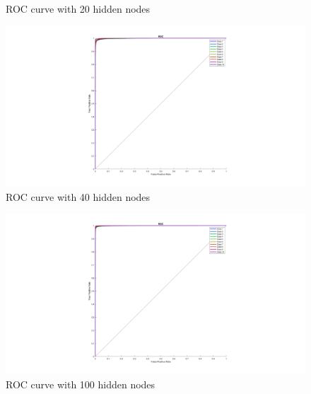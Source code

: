 \documentclass{article}
\begin{document}
{{\begin{figure}[H]
            \caption{ROC curve with 20 hidden nodes}
        \end{figure}
        \begin{figure}[H]
            \centering
            \includegraphics[width = 1.0\linewidth]{src1/ROC_40.png}
            \caption{ROC curve with 40 hidden nodes}
        \end{figure}
        \begin{figure}[H]
            \centering
            \includegraphics[width = 1.0\linewidth]{src1/ROC_100.png}
            \caption{ROC curve with 100 hidden nodes}
        \end{figure}
    }
    
}
\end{document}
